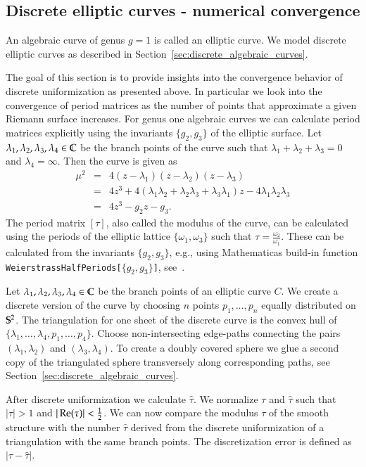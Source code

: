 \documentclass[Thesis.tex]{subfiles}
\begin{document}
\subsection{Discrete elliptic curves - numerical convergence}

An algebraic curve of genus $g=1$ is called an elliptic curve. We model discrete elliptic curves as described in Section~\ref{sec:discrete_algebraic_curves}.

The goal of this section is to provide insights into the convergence behavior of discrete uniformization as presented above. In particular we look into the convergence of period matrices as the number of points that approximate a given Riemann surface increases. For genus one algebraic curves we can calculate period matrices explicitly using the invariants $\{g_2,g_3\}$ of the elliptic surface. Let $\lambda_1,\lambda_2,\lambda_3,\lambda_4\in\C$ be the branch points of the curve such that $\lambda_1+\lambda_2+\lambda_3=0$ and $\lambda_4=\infty$. Then the curve is given as
\begin{eqnarray*}
\mu^2&=&4(z-\lambda_1)(z-\lambda_2)(z-\lambda_3)\\
&=&4z^3+4(\lambda_1\lambda_2+\lambda_2\lambda_3+\lambda_3\lambda_1)z - 4\lambda_1\lambda_2\lambda_3\\
&=&4z^3-g_2z-g_3.
\end{eqnarray*}
The period matrix $[\tau]$, also called the modulus of the curve, can be calculated using the periods of the elliptic lattice $\{\omega_1,\omega_3\}$ such that $\tau = \frac{\omega_2}{\omega_1}$. These can be calculated from the invariants $\{g_2,g_3\}$, e.g., using {\sc Mathematica}s build-in function {\tt WeierstrassHalfPeriods[$\{g_2,g_3\}$]}, see~\cite{WeierstrassHalfPeriods_website}.

Let $\lambda_1, \lambda_2, \lambda_3, \lambda_4 \in \C$ be the branch points of an elliptic curve $C$. We create a discrete version of the curve by choosing $n$ points $p_1,\ldots,p_n$ equally distributed on $\S^2$. The triangulation for one sheet of the discrete curve is the convex hull of $\{\lambda_1,\ldots,\lambda_4,p_1,\ldots, p_4\}$. Choose non-intersecting edge-paths connecting the pairs $(\lambda_1,\lambda_2)$ and $(\lambda_3,\lambda_4)$. To create a doubly covered sphere we glue a second copy of the triangulated sphere transversely along corresponding paths, see Section~\ref{sec:discrete_algebraic_curves}.

After discrete uniformization we calculate $\hat \tau$. We normalize $\tau$ and $\hat \tau$ such that $|\tau|>1$ and $|\re(\tau)| < \frac{1}{2}$. We can now compare the modulus $\tau$ of the smooth structure with the number $\hat \tau$ derived from the discrete uniformization of a triangulation with the same branch points. The discretization error is defined as $|\tau-\hat \tau|$.
\end{document}
